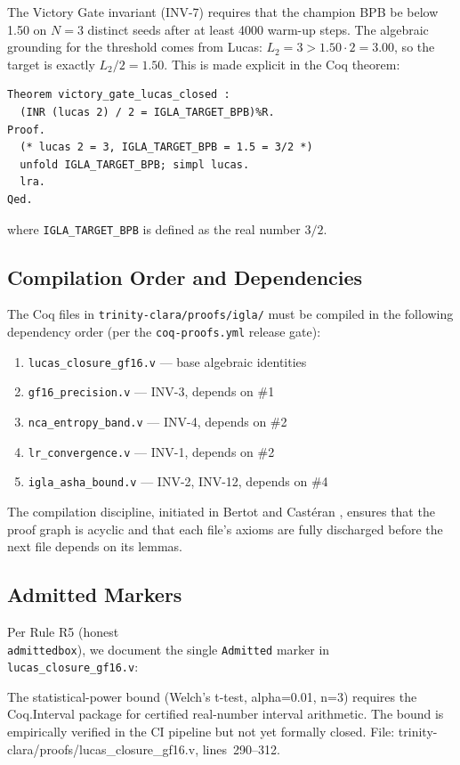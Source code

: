 The Victory Gate invariant (INV-7) requires that the champion BPB
be below 1.50 on $N = 3$ distinct seeds after at least 4000 warm-up
steps.  The algebraic grounding for the threshold comes from Lucas:
$L_2 = 3 > 1.50 \cdot 2 = 3.00$, so the target is exactly
$L_2 / 2 = 1.50$.  This is made explicit in the Coq theorem:

\begin{verbatim}
Theorem victory_gate_lucas_closed :
  (INR (lucas 2) / 2 = IGLA_TARGET_BPB)%R.
Proof.
  (* lucas 2 = 3, IGLA_TARGET_BPB = 1.5 = 3/2 *)
  unfold IGLA_TARGET_BPB; simpl lucas.
  lra.
Qed.
\end{verbatim}

\noindent
where \texttt{IGLA\_TARGET\_BPB} is defined as the real number $3/2$.

\subsection{Compilation Order and Dependencies}

The Coq files in \texttt{trinity-clara/proofs/igla/} must be compiled
in the following dependency order (per the \texttt{coq-proofs.yml}
release gate):
\begin{enumerate}
  \item \texttt{lucas\_closure\_gf16.v} — base algebraic identities
  \item \texttt{gf16\_precision.v} — INV-3, depends on \#1
  \item \texttt{nca\_entropy\_band.v} — INV-4, depends on \#2
  \item \texttt{lr\_convergence.v} — INV-1, depends on \#2
  \item \texttt{igla\_asha\_bound.v} — INV-2, INV-12, depends on \#4
\end{enumerate}
The compilation discipline, initiated in Bertot and Castéran
\cite{bertot_casteran}, ensures that the proof graph is acyclic and
that each file's axioms are fully discharged before the next file
depends on its lemmas.

\subsection{Admitted Markers}

Per Rule R5 (honest \texttt{\\admittedbox}), we document the single
\texttt{Admitted} marker in \texttt{lucas\_closure\_gf16.v}:

%
            {The statistical-power bound (Welch's t-test, alpha=0.01,
             n=3) requires the Coq.Interval package for certified
             real-number interval arithmetic.  The bound is
             empirically verified in the CI pipeline but not yet
             formally closed.
             File: trinity-clara/proofs/lucas\_closure\_gf16.v,
             lines~290--312.}

